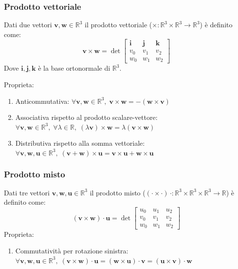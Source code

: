 \documentclass{article}
\begin{document}
    \subsubsection{Prodotto vettoriale}
        Dati due vettori $\mathbf{v}, \mathbf{w} \in \mathbb{R}^3$ il prodotto vettoriale ($\times : \mathbb{R}^3 \times \mathbb{R}^3 \rightarrow \mathbb{R}^3$) è definito come:
        \[
            \mathbf{v} \times \mathbf{w} = \det 
            \begin{bmatrix}
                \mathbf{i} & \mathbf{j} & \mathbf{k} \\
                v_0 & v_1 & v_2 \\
                w_0 & w_1 & w_2
            \end{bmatrix}
        \]
        Dove $\mathbf{i}, \mathbf{j}, \mathbf{k}$ è la base ortonormale di $\mathbb{R}^3$. 

        \vspace{5pt}
        Proprieta:
        \begin{enumerate}[label=(\arabic*)]
            \item Anticommutativa: $\forall \mathbf{v}, \mathbf{w} \in \mathbb{R}^3, \; \mathbf{v} \times \mathbf{w} = -(\mathbf{w} \times \mathbf{v})$ 
            \item Associativa rispetto al prodotto scalare-vettore: $\forall \mathbf{v}, \mathbf{w} \in \mathbb{R}^3, \; \forall \lambda \in \mathbb{R}, \; (\lambda\mathbf{v}) \times \mathbf{w} = \lambda(\mathbf{v} \times \mathbf{w})$
            \item Distributiva rispetto alla somma vettoriale: $\forall \mathbf{v}, \mathbf{w}, \mathbf{u} \in \mathbb{R}^3, \; (\mathbf{v} + \mathbf{w}) \times \mathbf{u} = \mathbf{v} \times \mathbf{u} + \mathbf{w} \times \mathbf{u}$
        \end{enumerate}
    
    \subsubsection{Prodotto misto}
        Dati tre vettori $\mathbf{v}, \mathbf{w}, \mathbf{u} \in \mathbb{R}^3$ il prodotto misto ($(\cdot \times \cdot) \, \cdot : \mathbb{R}^3 \times \mathbb{R}^3 \times \mathbb{R}^3 \rightarrow \mathbb{R}$) è definito come:
        \[
            (\mathbf{v} \times \mathbf{w}) \cdot \mathbf{u} = \det  
            \begin{bmatrix}
                u_0 & u_1 & u_2 \\
                v_0 & v_1 & v_2 \\
                w_0 & w_1 & w_2
            \end{bmatrix}
        \]
        Proprieta: 
        \begin{enumerate}[label=(\arabic*)]
            \item Commutatività per rotazione sinistra: $\forall \mathbf{v}, \mathbf{w}, \mathbf{u} \in \mathbb{R}^3, \; (\mathbf{v} \times \mathbf{w}) \cdot \mathbf{u} = (\mathbf{w} \times \mathbf{u}) \cdot \mathbf{v} = (\mathbf{u} \times \mathbf{v}) \cdot \mathbf{w}$  
        \end{enumerate}
\end{document}
